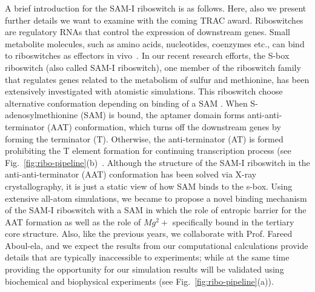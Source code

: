 \documentclass[a4paper,10pt]{article}
\begin{document}
A brief introduction for the SAM-I riboswitch is as follows.  Here, also we present further details we want to examine with the coming TRAC award.  Riboswitches are regulatory RNAs that control the expression of downstream genes. Small metabolite molecules, such as amino acids, nucleotides, coenzymes etc., can bind to riboswitches as effectors in vivo~\cite{mandal}.  In our recent research efforts, the S-box riboswitch (also called SAM-I riboswitch), one member of the riboswitch family that regulates genes related to the metabolism of sulfur and methionine, has been extensively investigated with atomistic simulations.  This riboswitch choose alternative conformation depending on binding of a SAM .  When S-adenosylmethionine (SAM) is bound, the aptamer domain forms anti-anti-terminator (AAT) conformation, which turns off the downstream genes by forming the terminator (T). Otherwise, the anti-terminator (AT) is formed prohibiting the T element formation for continuing transcription process (see Fig.~\ref{fig:ribo-pipeline}(b)~\cite{brooke}.  Although the structure of the SAM-I riboswitch in the anti-anti-terminator (AAT) conformation has been solved via X-ray crystallography, it is just a static view of how SAM binds to the s-box.  Using extensive all-atom simulations, we became to propose a novel binding mechanism of the SAM-I riboswitch with a SAM in which the role of entropic barrier for the AAT formation as well as the role of $Mg^2+$ specifically bound in the tertiary core structure.   Also, like the previous years, we collaborate with Prof. Fareed Aboul-ela, and we expect the results from our computational calculations provide details that are typically inaccessible to experiments; while at the same time providing the opportunity for our simulation results will be validated using biochemical and biophysical experiments (see Fig.~\ref{fig:ribo-pipeline}(a)).
\end{document}
